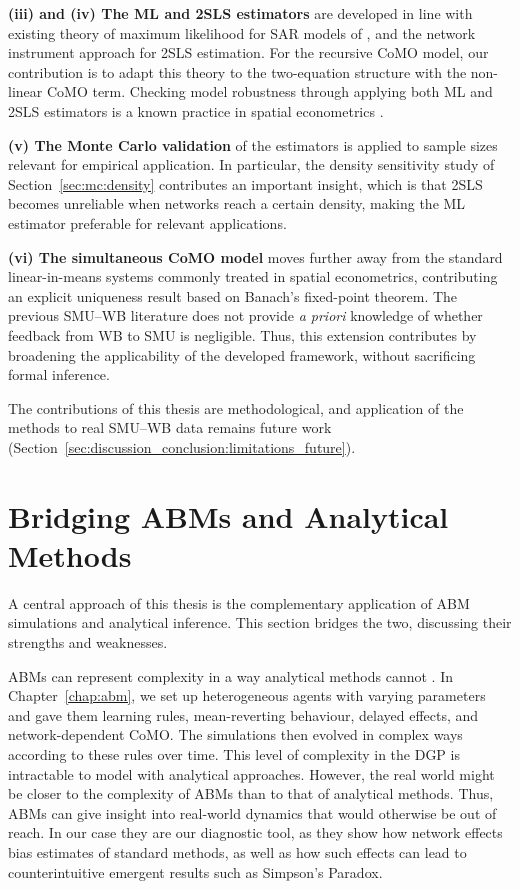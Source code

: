 \textbf{(iii) and (iv) The ML and 2SLS estimators} are developed in line with existing theory of maximum likelihood for SAR models of \textcite{Lee2004}, and the \textcite{Bramoulle2009} network instrument approach for 2SLS estimation. For the recursive CoMO model, our contribution is to adapt this theory to the two-equation structure with the non-linear CoMO term. Checking model robustness through applying both ML and 2SLS estimators is a known practice in spatial econometrics \parencite{LeSage2009}.

\textbf{(v) The Monte Carlo validation} of the estimators is applied to sample sizes relevant for empirical application. In particular, the density sensitivity study of Section~\ref{sec:mc:density} contributes an important insight, which is that 2SLS becomes unreliable when networks reach a certain density, making the ML estimator preferable for relevant applications.

\textbf{(vi) The simultaneous CoMO model} moves further away from the standard linear-in-means systems commonly treated in spatial econometrics, contributing an explicit uniqueness result based on Banach's fixed-point theorem. The previous SMU--WB literature does not provide \emph{a priori} knowledge of whether feedback from WB to SMU is negligible. Thus, this extension contributes by broadening the applicability of the developed framework, without sacrificing formal inference.

The contributions of this thesis are methodological, and application of the methods to real SMU--WB data remains future work (Section~\ref{sec:discussion_conclusion:limitations_future}).

\section{Bridging ABMs and Analytical Methods}
\label{sec:discussion_conclusion:gap}
A central approach of this thesis is the complementary application of ABM simulations and analytical inference. This section bridges the two, discussing their strengths and weaknesses.

ABMs can represent complexity in a way analytical methods cannot \parencite[Ch.~1]{Epstein2006}. In Chapter~\ref{chap:abm}, we set up heterogeneous agents with varying parameters and gave them learning rules, mean-reverting behaviour, delayed effects, and network-dependent CoMO\@. The simulations then evolved in complex ways according to these rules over time. This level of complexity in the DGP is intractable to model with analytical approaches. However, the real world might be closer to the complexity of ABMs than to that of analytical methods. Thus, ABMs can give insight into real-world dynamics that would otherwise be out of reach. In our case they are our diagnostic tool, as they show how network effects bias estimates of standard methods, as well as how such effects can lead to counterintuitive emergent results such as Simpson's Paradox.

